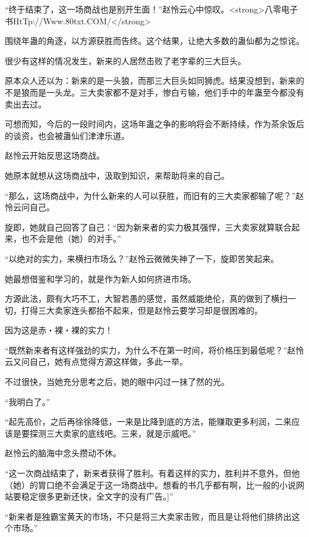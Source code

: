
\begin{this_body}

“终于结束了，这一场商战也是别开生面！”赵怜云心中惊叹。<strong>八零电子书HtTp://Www.80txt.COM/</strong>

围绕年蛊的角逐，以方源获胜而告终。这个结果，让绝大多数的蛊仙都为之惊诧。

很少有这样的情况发生，新来的人居然击败了老字辈的三大巨头。

原本众人还以为：新来的是一头狼，而那三大巨头如同狮虎。结果没想到，新来的不是狼而是一头龙。三大卖家都不是对手，惨白亏输，他们手中的年蛊至今都没有卖出去过。

可想而知，今后的一段时间内，这场年蛊之争的影响将会不断持续，作为茶余饭后的谈资，也会被蛊仙们津津乐道。

赵怜云开始反思这场商战。

她原本就想从这场商战中，汲取到知识，来帮助将来的自己。

“那么，这场商战中，为什么新来的人可以获胜，而旧有的三大卖家都输了呢？”赵怜云问自己。

旋即，她就自己回答了自己：“因为新来者的实力极其强悍，三大卖家就算联合起来，也不会是他（她）的对手。”

“以绝对的实力，来横扫市场么？”赵怜云微微失神了一下，旋即苦笑起来。

她最想借鉴和学习的，就是作为新人如何挤进市场。

方源此法，颇有大巧不工，大智若愚的感觉，虽然威能绝伦，真的做到了横扫一切，打得三大卖家连头都抬不起来，但是赵怜云要学习却是很困难的。

因为这是赤・裸・裸的实力！

“既然新来者有这样强劲的实力，为什么不在第一时间，将价格压到最低呢？”赵怜云又问自己，她有点觉得方源这样做，多此一举。

不过很快，当她充分思考之后，她的眼中闪过一抹了然的光。

“我明白了。”

“起先高价，之后再徐徐降低，一来是比降到底的方法，能赚取更多利润，二来应该是要探测三大卖家的底线吧。三来，就是示威吧。”

赵怜云的脑海中念头攒动不休。

“这一次商战结束了，新来者获得了胜利。有着这样的实力，胜利并不意外，但他（她）的胃口绝不会满足于这一场商战中。想看的书几乎都有啊，比一般的小说网站要稳定很多更新还快，全文字的没有广告。]”

“新来者是独霸宝黄天的市场，不只是将三大卖家击败，而且是让将他们排挤出这个市场。”


\end{this_body}
